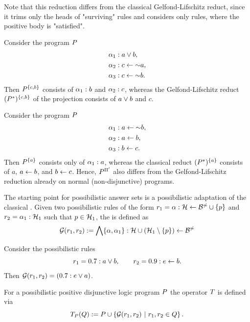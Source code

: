 Note that this reduction differs from the classical Gelfond-Lifschitz reduct, since it trims only the heads of "surviving" rules and considers only rules, where the positive body is "satisfied".
\begin{example}
    Consider the program $\pflp$
    \begin{align*}
        \lelem_1 & : a\flpor b,       \\
        \lelem_2 & : c\lpif\flpnot a, \\
        \lelem_3 & : c\lpif\flpnot b.
    \end{align*}
    Then $\pred{\pflp}{\set{c,b}}$ consists of $\pnec_1 : b$ and $\pnec_2 : c$, whereas the Gelfond-Lifschitz reduct $(\proj[\pflp])^{\set{c,b}}$ of the projection consists of $a\flpor b$ and $c$.
\end{example}

\begin{example}
    Consider the program $\pflp$
    \begin{align*}
        \lelem_1 & : a\lpif\flpnot b, \\
        \lelem_2 & : a\lpif b,        \\
        \lelem_3 & : b\lpif c.
    \end{align*}
    Then $\pred{\pflp}{\set{a}}$ consists only of $\pnec_1 : a$, whereas the classical reduct $(\proj[\pflp])^{\set{a}}$ consists of $a$, $a\lpif b$, and $b\lpif c$.
    Hence, $\pred{\pflp}{\Atomsalt}$ also differs from the Gelfond-Lifschitz reduction already on normal (non-disjunctive) programs.
\end{example}

The starting point for possibilistic answer sets is a possibilistic adaptation of the classical
.
Given two possibilistic rules of the form
$\prule_1 = \pnec : \head \lpif \pbody \cup \set{\atom}$ and %
$\prule_2 = \pnec_1 : \head_1$
such that $\atom\in \head_1$, the  is defined as
\[
    \GGPPE(\prule_1,\prule_2)\eqdef \bigglb\set{\pnec,\pnec_1}:\head\cup(\head_1\setminus\set{\atom})\lpif\pbody
\]
\begin{example}
    Consider the possibilistic rules
    \[
        \prule_1 = 0.7 : a\flpor b, \qquad \prule_2 = 0.9 : e\lpif b.
    \]
    Then $\GGPPE(\prule_1,\prule_2) = (0.7 : e\flpor a)$.
\end{example}

For a possibilistic positive disjunctive logic program $\pflp$ the operator $\plpop$ is defined via
\[
    \plpop_{\pflp}(\pflpalt)\eqdef\pflp\cup\set{\GGPPE(\prule_1,\prule_2)\guard\prule_1,\prule_2\in\pflpalt}.
\]

